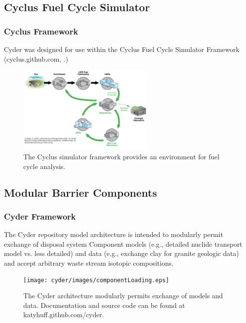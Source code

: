 
\subsection{Cyclus Fuel Cycle Simulator}

\begin{frame}[ctb!]
  \frametitle{Cyclus Framework}
  \footnotesize{
  Cyder was designed for use within the Cyclus Fuel Cycle Simulator Framework 
  (cyclus.github.com, \cite{huff_cyclus:_2010}.)
  \begin{figure}[htb!]
    \begin{center}
      \includegraphics[width=0.6\textwidth]{./cyder/images/simulations.eps}
    \end{center}
    \caption{The Cyclus simulator framework provides an environment for fuel 
    cycle analysis.}
    \label{fig:simulations}
  \end{figure}
}
\end{frame}

\subsection{Modular Barrier Components}

\begin{frame}[ctb!]
  \frametitle{Cyder Framework}
  \footnotesize{
The Cyder repository model architecture is intended to modularly permit 
exchange of disposal system Component models (e.g., detailed nuclide transport 
model vs. less detailed) and data (e.g., exchange clay for granite geologic 
data) and accept arbitrary waste stream isotopic compositions.  
  \begin{figure}[htbp!]
    \begin{center}
      \texttt{[image: cyder/images/componentLoading.eps]}
      \caption{The Cyder architecture modularly permits exchange of models and 
      data. Documentation and source code can be found at katyhuff.github.com/cyder.}
    \end{center}
  \end{figure}
}
\end{frame}

